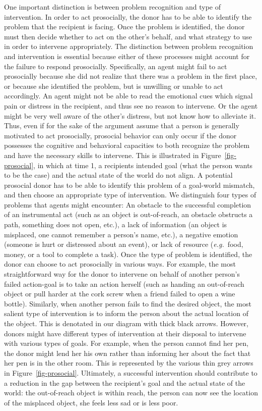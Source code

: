 \documentclass{article}
\newcommand{\eg}{{\textit{e.g.~}}}
\begin{document}
One important distinction is between problem recognition and type of
intervention. In order to act prosocially, the donor has to be able to identify
the problem that the recipient is facing. Once the problem is identified, the
donor must then decide whether to act on the other{}'s behalf, and what
strategy to use in order to intervene appropriately.  The distinction between
problem recognition and intervention is essential because either of these
processes might account for the failure to respond prosocially. Specifically,
an agent might fail to act prosocially because she did not realize that there
was a problem in the first place, or because she identified the problem, but is
unwilling or unable to act accordingly. An agent might not be able to read the
emotional cues which signal pain or distress in the recipient, and thus see no
reason to intervene. Or the agent might be very well aware of the other{}'s
distress, but not know how to alleviate it. Thus, even if for the sake of the
argument assume that a person is generally motivated to act prosocially,
prosocial behavior can only occur if the donor possesses the cognitive and
behavioral capacities to both recognize the problem and have the necessary
skills to intervene. This is illustrated in Figure~\ref{fig-prosocial}, in
which at time 1, a recipients intended goal (what the person wants to be the
case) and the actual state of the world do not align. A potential prosocial
donor has to be able to identify this problem of a goal-world mismatch, and
then choose an appropriate type of intervention. We distinguish four types of
problems that agents might encounter: An obstacle to the successful completion
of an instrumental act (such as an object is out-of-reach, an obstacle
obstructs a path, something does not open, etc.), a lack of information (an
object is misplaced, one cannot remember a person{}'s name, etc.), a negative
emotion (someone is hurt or distressed about an event), or lack of resource
(\eg food, money, or a tool to complete a task). Once the type of problem is
identified, the donor can choose to act prosocially in various ways. For
example, the most straightforward way for the donor to intervene on behalf of
another person{}'s failed action-goal is to take an action herself (such as
handing an out-of-reach object or pull harder at the cork screw when a friend
failed to open a wine bottle).  Similarly, when another person fails to find
the desired object, the most salient type of intervention is to inform the
person about the actual location of the object. This is denotated in our
diagram with thick black arrows. However, donors might have different types of
intervention at their disposal to intervene with various types of goals. For
example, when the person cannot find her pen, the donor might lend her his own
rather than informing her about the fact that her pen is in the other room.
This is represented by the various thin grey arrows in
Figure~\ref{fig-prosocial}. Ultimately, a successful intervention should
contribute to a reduction in the gap between the recipient{}'s goal and the
actual state of the world: the out-of-reach object is within reach, the person
can now see the location of the misplaced object, she feels less sad or is less
poor.
\end{document}
